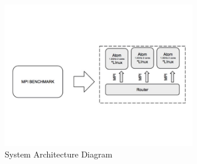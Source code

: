 \begin{figure}[H]
\centering
\includegraphics[width=0.75\textwidth]{images/full_diagram.jpg}
\caption{System Architecture Diagram }
\label{fig:4.4}
\end{figure}

\noindent

\clearpage
